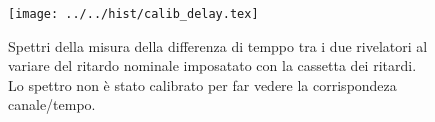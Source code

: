 \begin{figure}[h] \centering\texttt{[image: ../../hist/calib\_delay.tex]}\caption{Spettri della misura della differenza di temppo tra i due rivelatori al variare del ritardo nominale imposatato con la cassetta dei ritardi. Lo spettro non è stato calibrato per far vedere la corrispondeza canale/tempo.}\label{hist:calib_delay} \end{figure}

